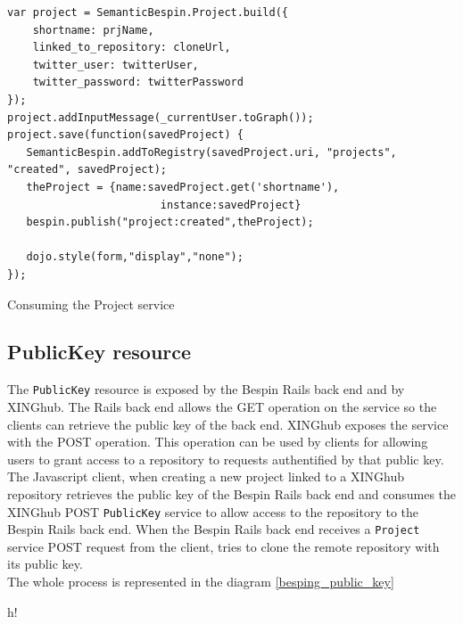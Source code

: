 \begin{table}
\vspace{5 mm}
\begin{lstlisting}
var project = SemanticBespin.Project.build({
    shortname: prjName,
    linked_to_repository: cloneUrl,
    twitter_user: twitterUser,
    twitter_password: twitterPassword
});
project.addInputMessage(_currentUser.toGraph());
project.save(function(savedProject) {                            
   SemanticBespin.addToRegistry(savedProject.uri, "projects", "created", savedProject);
   theProject = {name:savedProject.get('shortname'), 
                        instance:savedProject}
   bespin.publish("project:created",theProject);

   dojo.style(form,"display","none");
});
\end{lstlisting} 
\vspace{5 mm}
\caption{Consuming the Project service}
\label{bespin_new_src}
\end{table}

\subsection{PublicKey resource}

The \texttt{PublicKey} resource is exposed by the Bespin Rails back end and by XINGhub. The Rails back end allows the GET
operation on the service so the clients can retrieve the public key of the back end. XINGhub exposes the service with
the POST operation. This operation can be used by clients for allowing users to grant access to a repository to requests
authentified by that public key.\\
The Javascript client, when creating a new project linked to a XINGhub repository retrieves the public key of the Bespin
Rails back end and consumes the XINGhub POST \texttt{PublicKey} service to allow access to the repository to the Bespin Rails back
end. When the Bespin Rails back end receives a \texttt{Project} service POST request from the client, tries to clone the remote
repository with its public key.\\
The whole process is represented in the diagram \ref{besping_public_key}


\begin{table}{h!}
\noindent{}
\caption{Creation of a new project exchanging public keys}
\label{bespin_public_key}
\end{table}


